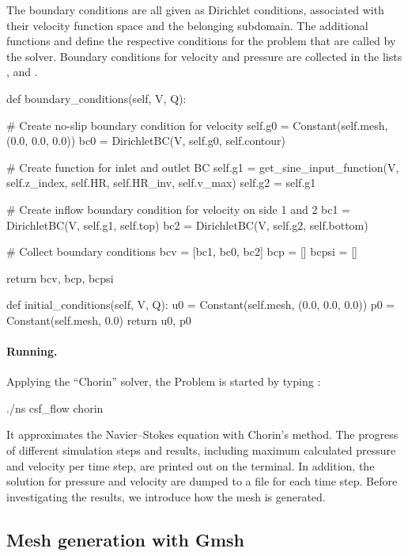 The boundary conditions are all given as Dirichlet conditions,
associated with their velocity function space and the belonging
subdomain. The additional functions  and
 define the respective conditions for the problem
that are called by the solver. Boundary conditions for velocity and
pressure are collected in the lists ,  and .
\begin{python}
def boundary_conditions(self, V, Q):

    # Create no-slip boundary condition for velocity
    self.g0 = Constant(self.mesh, (0.0, 0.0, 0.0))
    bc0 = DirichletBC(V, self.g0, self.contour)

    # Create function for inlet and outlet BC
    self.g1 = get_sine_input_function(V, self.z_index, self.HR, self.HR_inv,
                                      self.v_max)
    self.g2 = self.g1

    # Create inflow boundary condition for velocity on side 1 and 2
    bc1 = DirichletBC(V, self.g1, self.top)
    bc2 = DirichletBC(V, self.g2, self.bottom)

    # Collect boundary conditions
    bcv = [bc1, bc0, bc2]
    bcp = []
    bcpsi = []

    return bcv, bcp, bcpsi

def initial_conditions(self, V, Q):
    u0 = Constant(self.mesh, (0.0, 0.0, 0.0))
    p0 = Constant(self.mesh, 0.0)
    return u0, p0
\end{python}

\paragraph{Running.}
Applying the ``Chorin'' solver, the Problem is started by typing :
\begin{bash}
./ns csf_flow chorin
\end{bash}

It approximates the Navier--Stokes equation with Chorin's method. The
progress of different simulation steps and results, including maximum
calculated pressure and velocity per time step, are printed out on the
terminal. In addition, the solution for pressure and velocity are
dumped to a file for each time step. Before investigating the results,
we introduce how the mesh is generated.

\subsection{Mesh generation with Gmsh}

